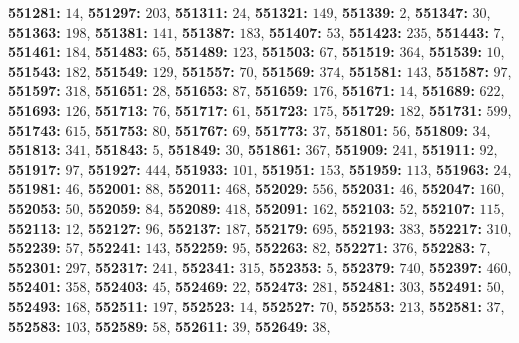 \textsf{\bfseries 551281:} $14$, \textsf{\bfseries 551297:} $203$, \textsf{\bfseries 551311:} $24$, \textsf{\bfseries 551321:} $149$, \textsf{\bfseries 551339:} $2$, \textsf{\bfseries 551347:} $30$, \textsf{\bfseries 551363:} $198$, \textsf{\bfseries 551381:} $141$, \textsf{\bfseries 551387:} $183$, \textsf{\bfseries 551407:} $53$, \textsf{\bfseries 551423:} $235$, \textsf{\bfseries 551443:} $7$, \textsf{\bfseries 551461:} $184$, \textsf{\bfseries 551483:} $65$, \textsf{\bfseries 551489:} $123$, \textsf{\bfseries 551503:} $67$, \textsf{\bfseries 551519:} $364$, \textsf{\bfseries 551539:} $10$, \textsf{\bfseries 551543:} $182$, \textsf{\bfseries 551549:} $129$, \textsf{\bfseries 551557:} $70$, \textsf{\bfseries 551569:} $374$, \textsf{\bfseries 551581:} $143$, \textsf{\bfseries 551587:} $97$, \textsf{\bfseries 551597:} $318$, \textsf{\bfseries 551651:} $28$, \textsf{\bfseries 551653:} $87$, \textsf{\bfseries 551659:} $176$, \textsf{\bfseries 551671:} $14$, \textsf{\bfseries 551689:} $622$, \textsf{\bfseries 551693:} $126$, \textsf{\bfseries 551713:} $76$, \textsf{\bfseries 551717:} $61$, \textsf{\bfseries 551723:} $175$, \textsf{\bfseries 551729:} $182$, \textsf{\bfseries 551731:} $599$, \textsf{\bfseries 551743:} $615$, \textsf{\bfseries 551753:} $80$, \textsf{\bfseries 551767:} $69$, \textsf{\bfseries 551773:} $37$, \textsf{\bfseries 551801:} $56$, \textsf{\bfseries 551809:} $34$, \textsf{\bfseries 551813:} $341$, \textsf{\bfseries 551843:} $5$, \textsf{\bfseries 551849:} $30$, \textsf{\bfseries 551861:} $367$, \textsf{\bfseries 551909:} $241$, \textsf{\bfseries 551911:} $92$, \textsf{\bfseries 551917:} $97$, \textsf{\bfseries 551927:} $444$, \textsf{\bfseries 551933:} $101$, \textsf{\bfseries 551951:} $153$, \textsf{\bfseries 551959:} $113$, \textsf{\bfseries 551963:} $24$, \textsf{\bfseries 551981:} $46$, \textsf{\bfseries 552001:} $88$, \textsf{\bfseries 552011:} $468$, \textsf{\bfseries 552029:} $556$, \textsf{\bfseries 552031:} $46$, \textsf{\bfseries 552047:} $160$, \textsf{\bfseries 552053:} $50$, \textsf{\bfseries 552059:} $84$, \textsf{\bfseries 552089:} $418$, \textsf{\bfseries 552091:} $162$, \textsf{\bfseries 552103:} $52$, \textsf{\bfseries 552107:} $115$, \textsf{\bfseries 552113:} $12$, \textsf{\bfseries 552127:} $96$, \textsf{\bfseries 552137:} $187$, \textsf{\bfseries 552179:} $695$, \textsf{\bfseries 552193:} $383$, \textsf{\bfseries 552217:} $310$, \textsf{\bfseries 552239:} $57$, \textsf{\bfseries 552241:} $143$, \textsf{\bfseries 552259:} $95$, \textsf{\bfseries 552263:} $82$, \textsf{\bfseries 552271:} $376$, \textsf{\bfseries 552283:} $7$, \textsf{\bfseries 552301:} $297$, \textsf{\bfseries 552317:} $241$, \textsf{\bfseries 552341:} $315$, \textsf{\bfseries 552353:} $5$, \textsf{\bfseries 552379:} $740$, \textsf{\bfseries 552397:} $460$, \textsf{\bfseries 552401:} $358$, \textsf{\bfseries 552403:} $45$, \textsf{\bfseries 552469:} $22$, \textsf{\bfseries 552473:} $281$, \textsf{\bfseries 552481:} $303$, \textsf{\bfseries 552491:} $50$, \textsf{\bfseries 552493:} $168$, \textsf{\bfseries 552511:} $197$, \textsf{\bfseries 552523:} $14$, \textsf{\bfseries 552527:} $70$, \textsf{\bfseries 552553:} $213$, \textsf{\bfseries 552581:} $37$, \textsf{\bfseries 552583:} $103$, \textsf{\bfseries 552589:} $58$, \textsf{\bfseries 552611:} $39$, \textsf{\bfseries 552649:} $38$, 
